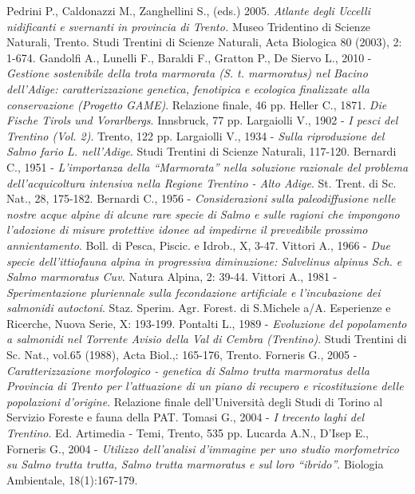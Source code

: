 \documentclass[10pt,twoside,openany,x11names,svgnames,italian,a5paper,dvipsnames,table]{memoir}
\begin{document}
\begin{thebibliography}{9}
Pedrini P., Caldonazzi M., Zanghellini S., (eds.) 2005. \emph{Atlante degli Uccelli nidificanti e svernanti in provincia di Trento.} Museo Tridentino di Scienze Naturali, Trento. Studi Trentini di Scienze Naturali, Acta Biologica 80 (2003), 2: 1-674.
 Gandolfi A., Lunelli F., Baraldi F., Gratton P., De Siervo L., 2010 - \emph{Gestione sostenibile della trota marmorata (S. t. marmoratus) nel Bacino dell’Adige: caratterizzazione genetica, fenotipica e ecologica finalizzate alla conservazione (Progetto GAME)}. Relazione finale, 46 pp.
 Heller C., 1871. \emph{Die Fische Tirols und Vorarlbergs}. Innsbruck, 77 pp. 
 Largaiolli V., 1902 - \emph{I pesci del Trentino (Vol. 2)}. Trento, 122 pp.
 Largaiolli  V., 1934 - \emph{Sulla riproduzione del Salmo fario L. nell’Adige}. Studi Trentini di Scienze Naturali, 117-120.
 Bernardi C., 1951 - \emph{L’importanza della “Marmorata” nella soluzione razionale del problema dell’acquicoltura intensiva nella Regione Trentino - Alto Adige}. St. Trent. di Sc. Nat., 28, 175-182. 
 Bernardi C., 1956 - \emph{Considerazioni sulla paleodiffusione nelle nostre acque alpine di alcune rare specie di Salmo e sulle ragioni che impongono l’adozione di misure protettive idonee ad impedirne il prevedibile prossimo annientamento}. Boll. di Pesca, Piscic. e Idrob., X, 3-47.
 Vittori A., 1966 - \emph{Due specie dell’ittiofauna alpina in progressiva diminuzione: Salvelinus alpinus Sch. e Salmo marmoratus Cuv.} Natura Alpina, 2: 39-44. 
 Vittori A., 1981 - \emph{Sperimentazione pluriennale sulla fecondazione artificiale e l’incubazione dei salmonidi autoctoni}. Staz. Sperim. Agr. Forest. di S.Michele a/A. Esperienze e Ricerche, Nuova Serie, X: 193-199.
 Pontalti L., 1989 - \emph{Evoluzione del popolamento a salmonidi nel Torrente Avisio della Val di Cembra (Trentino)}. Studi Trentini di Sc. Nat., vol.65 (1988), Acta Biol.,: 165-176, Trento.
 Forneris G., 2005 - \emph{Caratterizzazione morfologico - genetica di Salmo trutta marmoratus della Provincia di Trento per l’attuazione di un piano di recupero e ricostituzione delle popolazioni d’origine}. Relazione finale dell’Università degli Studi di Torino al Servizio Foreste e fauna della PAT.
 Tomasi G., 2004 - \emph{I trecento laghi del Trentino}. Ed. Artimedia - Temi, Trento, 535 pp.
 Lucarda A.N., D’Isep E., Forneris G., 2004 - \emph{Utilizzo dell’analisi d’immagine per uno studio morfometrico su Salmo trutta trutta, Salmo trutta marmoratus e sul loro “ibrido”}. Biologia Ambientale, 18(1):167-179.

\end{thebibliography}
\end{document}
